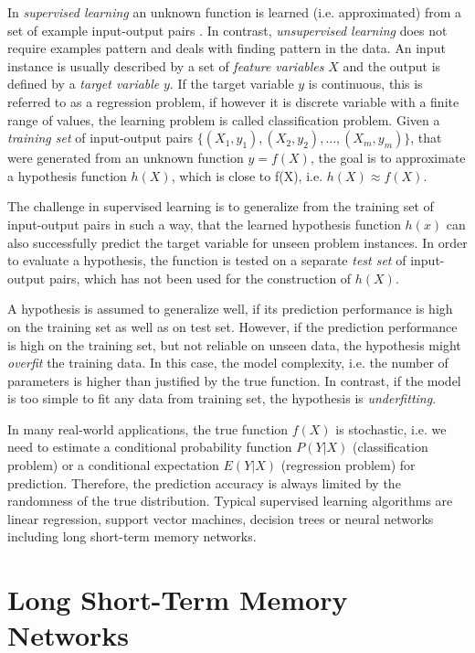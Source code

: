 In \textit{supervised learning} an unknown function is learned (i.e. approximated) from a set of example input-output pairs \cite{DBLP:books/daglib/0023820}.
In contrast, \textit{unsupervised learning} does not require examples pattern and deals with finding pattern in the data. 
An input instance is usually described by a set of \textit{feature variables} $X$ and the output is defined by a \textit{target variable} $y$.
If the target variable $y$ is continuous, this is referred to as a regression problem, if however it is discrete variable with a finite range of values, the learning problem is called classification problem.
Given a \textit{training set} of input-output pairs $\{(X_1, y_1), (X_2, y_2), \dots, (X_m,y_m)\}$, that were generated from an unknown function $y = f(X)$, the goal is to approximate a hypothesis function $h(X)$, which is close to f(X), i.e. $h(X) \approx f(X)$.

The challenge in supervised learning is to generalize from the training set of input-output pairs in such a way, that the learned hypothesis function $h(x)$ can also successfully predict the target variable for unseen problem instances.
In order to evaluate a hypothesis, the function is tested on a separate \textit{test set} of input-output pairs, which has not been used for the construction of $h(X)$.

A hypothesis is assumed to generalize well, if its prediction performance is high on the training set as well as on test set.
However, if the prediction performance is high on the training set, but not reliable on unseen data, the hypothesis might \textit{overfit} the training data.
In this case, the model complexity, i.e. the number of parameters is higher than justified by the true function. 
In contrast, if the model is too simple to fit any data from training set, the hypothesis is \textit{underfitting}.

In many real-world applications, the true function $f(X)$ is stochastic, i.e. we need to estimate a conditional probability function $P(Y | X)$ (classification problem) or a conditional expectation $E(Y | X)$ (regression problem) for prediction.
Therefore, the prediction accuracy is always limited by the randomness of the true distribution.
Typical supervised learning algorithms are linear regression, support vector machines, decision trees or neural networks including long short-term memory networks.
\section{Long Short-Term Memory Networks}

